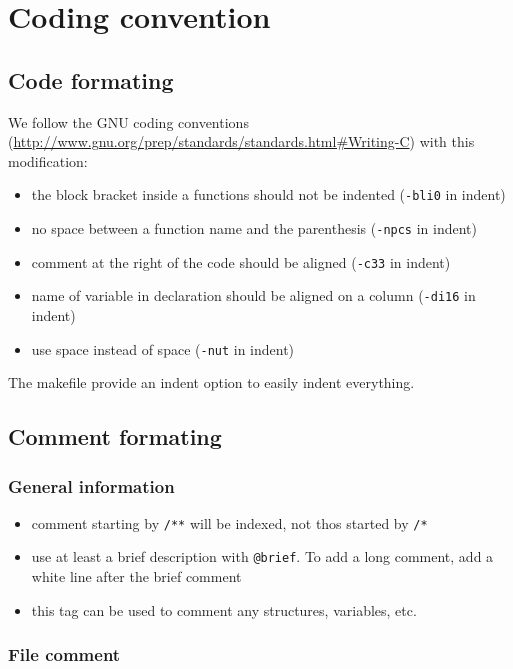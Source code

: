 \chapter{Coding convention}

\section{Code formating}
We follow the GNU coding conventions (\url{http://www.gnu.org/prep/standards/standards.html#Writing-C}) with this modification:
\begin{itemize}
  \item the block bracket inside a functions should not be indented (\verb+-bli0+ in indent)
  \item no space between a function name and the parenthesis (\verb+-npcs+ in indent)
  \item comment at the right of the code should be aligned (\verb+-c33+ in indent)
  \item name of variable in declaration should be aligned on a column (\verb+-di16+ in indent)
  \item use space instead of space (\verb+-nut+ in indent)	
\end{itemize}

The makefile provide an indent option to easily indent everything.

\section{Comment formating}

\subsection{General information}

\begin{itemize}
  \item comment starting by \verb+/**+ will be indexed, not thos started by \verb+/*+
  \item use at least a brief description with \verb+@brief+. To add a long comment, add a white line after the brief comment
  \item this tag can be used to comment any structures, variables, etc.
\end{itemize}

\subsection{File comment}

